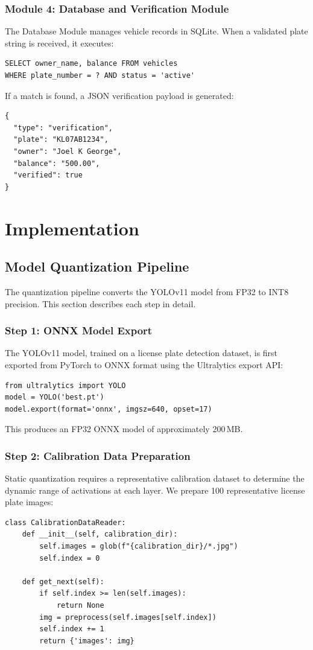\subsection{Module 4: Database and Verification Module}
The Database Module manages vehicle records in SQLite. When a validated plate string is received, it executes:
\begin{verbatim}
SELECT owner_name, balance FROM vehicles 
WHERE plate_number = ? AND status = 'active'
\end{verbatim}

If a match is found, a JSON verification payload is generated:
\begin{verbatim}
{
  "type": "verification",
  "plate": "KL07AB1234",
  "owner": "Joel K George",
  "balance": "500.00",
  "verified": true
}
\end{verbatim}

\chapter{Implementation}
\section{Model Quantization Pipeline}

The quantization pipeline converts the YOLOv11 model from FP32 to INT8 precision. This section describes each step in detail.

\subsection{Step 1: ONNX Model Export}
The YOLOv11 model, trained on a license plate detection dataset, is first exported from PyTorch to ONNX format using the Ultralytics export API:
\begin{verbatim}
from ultralytics import YOLO
model = YOLO('best.pt')
model.export(format='onnx', imgsz=640, opset=17)
\end{verbatim}

This produces an FP32 ONNX model of approximately 200\,MB.

\subsection{Step 2: Calibration Data Preparation}
Static quantization requires a representative calibration dataset to determine the dynamic range of activations at each layer. We prepare 100 representative license plate images:
\begin{verbatim}
class CalibrationDataReader:
    def __init__(self, calibration_dir):
        self.images = glob(f"{calibration_dir}/*.jpg")
        self.index = 0
    
    def get_next(self):
        if self.index >= len(self.images):
            return None
        img = preprocess(self.images[self.index])
        self.index += 1
        return {'images': img}
\end{verbatim}

